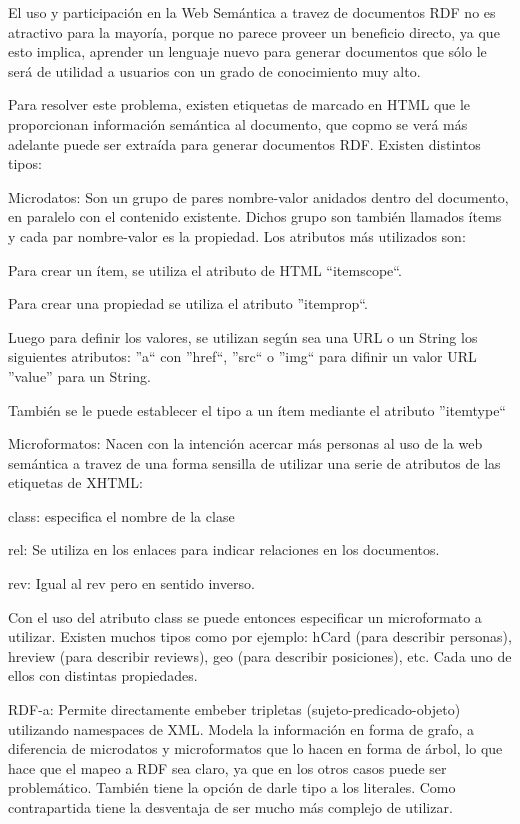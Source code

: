 El uso y participación en la Web Semántica a travez de documentos RDF no es atractivo para la mayoría, porque no parece proveer un beneficio 
directo, ya que esto implica, aprender un lenguaje nuevo para generar documentos que sólo le será de utilidad a usuarios con un grado de conocimiento 
muy alto. 

Para resolver este problema, existen etiquetas de marcado en HTML que le proporcionan información semántica al documento, que copmo se verá más adelante 
puede ser extraída para generar documentos RDF. Existen distintos tipos:

Microdatos: Son un grupo de pares nombre-valor anidados dentro del documento, en paralelo con el contenido existente. Dichos grupo son 
también llamados ítems y cada par nombre-valor es la propiedad. Los atributos más utilizados son:

Para crear un ítem, se utiliza el atributo de HTML ``itemscope``. 

Para crear una propiedad se utiliza el atributo ''itemprop``.

Luego para definir los valores, se utilizan según sea una URL o un String los siguientes atributos:
''a`` con ''href``, ''src`` o ''img`` para difinir un valor URL
''value'' para un String.

También se le puede establecer el tipo a un ítem mediante el atributo ''itemtype``


Microformatos: Nacen con la intención acercar más personas al uso de la web semántica a travez de una forma sensilla de utilizar 
una serie de atributos de las etiquetas de XHTML:

class: especifica el nombre de la clase

rel: Se utiliza en los enlaces para indicar relaciones en los documentos.

rev: Igual al rev pero en sentido inverso.

Con el uso del atributo class se puede entonces especificar un microformato a utilizar. Existen muchos tipos como por ejemplo: hCard (para describir 
personas), hreview (para describir reviews), geo (para describir posiciones), etc. Cada uno de ellos con distintas propiedades.


RDF-a: Permite directamente embeber tripletas (sujeto-predicado-objeto) utilizando namespaces de XML. Modela la información en forma de grafo, 
a diferencia de microdatos y microformatos que lo hacen en forma de árbol, lo que hace que el mapeo a RDF sea claro, ya que en los otros casos puede ser problemático.
También tiene la opción de darle tipo a los literales. Como contrapartida tiene la desventaja de ser mucho más complejo de utilizar. 

